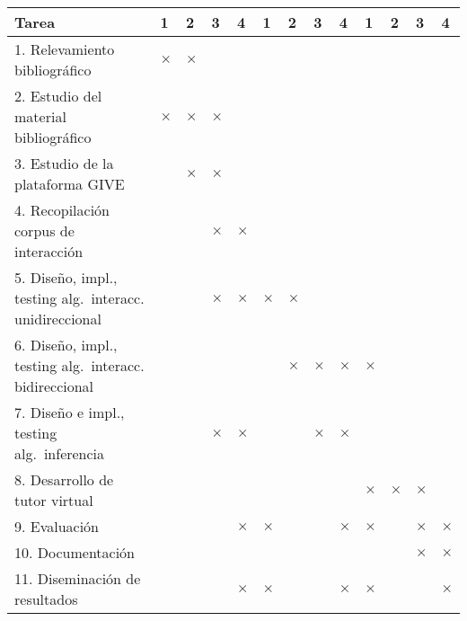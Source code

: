 {\footnotesize
\begin{center}
\begin{tabular}{|p{7cm}||p{2mm}|p{2mm}|p{2mm}|p{2mm}||p{2mm}|p{2mm}|p{2mm}|p{2mm
}||p{2mm}|p{2mm}|p{2mm}|p{2mm}||}
\hline
 \rowcolor[rgb]{0.8,0.8,0.8}\hspace{3.5cm}Tarea & 1 & 2 & 3 & 4 & 1 & 2 & 3 & 4
& 1 & 2 & 3 & 4\\
\hline 1. Relevamiento bibliogr\'afico & $\times$ & $\times$ &&&&&&&&&&\\
\hline 2. Estudio del material bibliogr\'afico & $\times$ & $\times$ & $\times$ &  &&&&&&&&\\
\hline 3. Estudio de la plataforma GIVE & & $\times$ &$\times$&&&&&&&&&\\
\hline 4. Recopilaci\'on corpus de interacci\'on & & & $\times$ &$\times$&&&&&&&&\\
\hline 5. Dise\~no, impl., testing alg.\ interacc. unidireccional & & & $\times$ & $\times$&$\times$&$\times$&&&&&&\\
\hline 6. Dise\~no, impl., testing alg.\ interacc. bidireccional & & &  & &&$\times$&$\times$&$\times$&$\times$&&&\\
\hline 7. Dise\~no e impl., testing alg.\ inferencia & & & $\times$ & $\times$&&&$\times$&$\times$&&&&\\
\hline 8. Desarrollo de tutor virtual &&&&&&&&&$\times$&$\times$&$\times$&\\
\hline 9. Evaluaci\'on &&&&$\times$&$\times$&&&$\times$&$\times$&&$\times$&$\times$\\
\hline 10. Documentaci\'on &&&&&&&&&&&$\times$&$\times$\\
\hline 11. Diseminaci\'on de resultados &&&&$\times$&$\times$&&&$\times$&$\times$&&&$\times$\\\hline
\end{tabular}\end{center}
}


